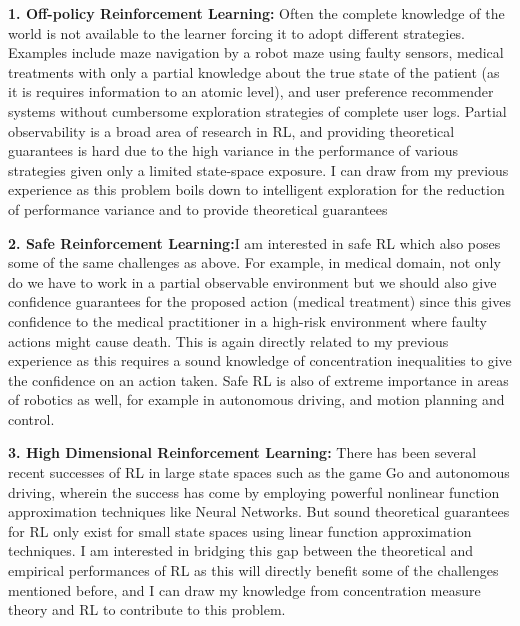 \documentclass{article}
\begin{document}
\textbf{1. Off-policy Reinforcement Learning:} Often the complete knowledge of the world is not available to the learner forcing it to adopt different strategies. Examples include maze navigation by a robot maze using faulty sensors, medical treatments with only a partial knowledge about the true state of the patient (as it is requires information to
an atomic level), and user preference recommender systems without cumbersome exploration strategies of complete user logs. Partial observability is a broad area of research in RL, and providing theoretical guarantees is hard due to the high variance in the performance of various strategies given only a limited state-space exposure. I
can draw from my previous experience as this problem boils down to intelligent exploration for the reduction of performance variance and to provide theoretical guarantees


\textbf{2. Safe Reinforcement Learning:}I am interested in safe RL which also poses some of the same challenges as above. For example, in medical domain, not only do we have to work in a partial observable environment but we should also give confidence guarantees for the proposed action (medical treatment) since this gives confidence to the medical
practitioner in a high-risk environment where faulty actions might cause death. This is again directly related to my previous experience as this requires a sound knowledge of concentration inequalities to give the confidence on an action taken. Safe RL is also of extreme importance in areas of robotics as well, for example in autonomous driving,
and motion planning and control.


\textbf{3. High Dimensional Reinforcement Learning:} There has been several recent successes of RL in large state spaces such as the game Go and autonomous driving, wherein the success has come by employing powerful nonlinear function approximation techniques like Neural Networks. But sound theoretical guarantees for RL only exist
for small state spaces using linear function approximation techniques. I am interested in bridging this gap between the theoretical and empirical performances of RL as this will directly benefit some of the challenges mentioned before, and I can draw my knowledge from concentration measure theory and RL to contribute to this problem.



\end{document}
